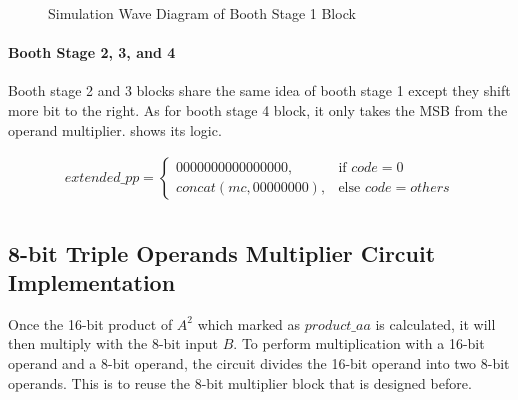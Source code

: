 \begin{figure}[!ht]
	\centering
	\caption{Simulation Wave Diagram of Booth Stage 1 Block}

	\hspace{0.5cm}

	\label{fig:booth_stage_1_sim}
\end{figure}

\paragraph{Booth Stage 2, 3, and 4}
Booth stage 2 and 3 blocks share the same idea of booth stage 1 except they shift more bit to the right.
As for booth stage 4 block, it only takes the MSB from the operand multiplier.  shows its logic.

\begin{equation}
	\begin{array}{c}
		extended\_pp =
		\begin{cases}
			0000000000000000,    & \text{if } code = 0        \\
			concat(mc,00000000), & \text{else } code = others
		\end{cases} \\
	\end{array}
	\label{exp:booth_stage_4}
\end{equation}

\subsection{8-bit Triple Operands Multiplier Circuit Implementation}

Once the 16-bit product of \textbf{\(A^2\)} which marked as \(product\_aa\) is calculated, it will then multiply with the 8-bit input \(B\).
To perform multiplication with a 16-bit operand and a 8-bit operand, the circuit divides the 16-bit operand into two 8-bit operands.
This is to reuse the 8-bit multiplier block that is designed before.

